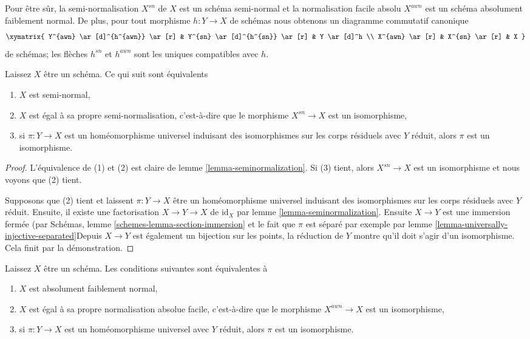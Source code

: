 \noindent
Pour être sûr, la semi-normalisation $X^{sn}$ de $X$ est un schéma semi-normal et la normalisation facile absolu $X^{awn}$ est un schéma absolument faiblement normal. De plus, pour tout morphisme $h : Y \to X$ de schémas nous obtenons un diagramme commutatif canonique $$
\xymatrix{
Y^{awn} \ar[d]^{h^{awn}} \ar[r] &
Y^{sn} \ar[d]^{h^{sn}} \ar[r] &
Y \ar[d]^h \\
X^{awn} \ar[r] &
X^{sn} \ar[r] &
X
}
$$ de schémas; les flèches $h^{sn}$ et $h^{awn}$ sont les uniques compatibles avec $h$.

\begin{lemma}

\label{lemma-characterize-seminormal}
Laissez $X$ être un schéma. Ce qui suit sont équivalents
\begin{enumerate}
\item $X$ est semi-normal,
\item $X$ est égal à sa propre semi-normalisation, c'est-à-dire que le morphisme $X^{sn} \to X$ est un isomorphisme,
\item si $\pi : Y \to X$ est un homéomorphisme universel induisant des isomorphismes sur les corps résiduels avec $Y$ réduit, alors $\pi$ est un isomorphisme.
\end{enumerate}

\end{lemma}

\begin{proof}
L'équivalence de (1) et (2) est claire de lemme \ref{lemma-seminormalization}. Si (3) tient, alors $X^{sn} \to X$ est un isomorphisme et nous voyons que (2) tient.

\medskip\noindent

Supposons que (2) tient et laissent $\pi : Y \to X$ être un homéomorphisme universel induisant des isomorphismes sur les corps résiduels avec $Y$ réduit. Ensuite, il existe une factorisation $X \to Y \to X$ de $\text{id}_X$ par lemme \ref{lemma-seminormalization}. Ensuite $X \to Y$ est une immersion fermée (par Schémas, lemme \ref{schemes-lemma-section-immersion}
et le fait que $\pi$ est séparé par exemple par lemme \ref{lemma-universally-injective-separated}Depuis $X \to Y$
est également un bijection sur les points, la réduction de $Y$ montre qu'il doit s'agir d'un isomorphisme. Cela finit par la démonstration.

\end{proof}

\begin{lemma}

\label{lemma-characterize-absolutely-weakly-normal}
Laissez $X$ être un schéma. Les conditions suivantes sont équivalentes à
\begin{enumerate}
\item $X$ est absolument faiblement normal,
\item $X$ est égal à sa propre normalisation absolue facile, c'est-à-dire que le morphisme $X^{awn} \to X$ est un isomorphisme,
\item si $\pi : Y \to X$ est un homéomorphisme universel avec $Y$ réduit, alors $\pi$ est un isomorphisme.
\end{enumerate}

\end{lemma}

